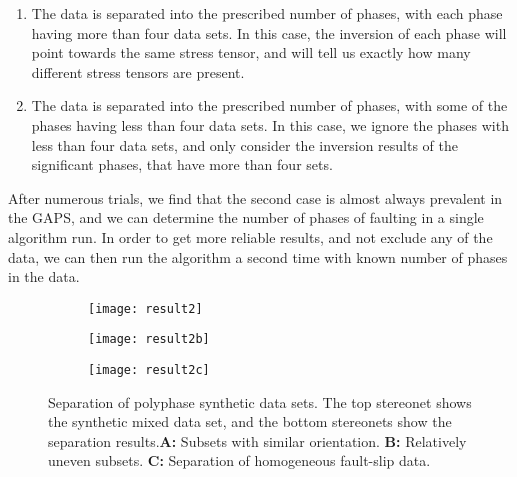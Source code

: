 \renewcommand{\theenumi}{\roman{enumi}}
\begin{enumerate}
    \item The data is separated into the prescribed number of phases, with each phase having more than four data sets. In this case, the inversion of each phase will point towards the same stress tensor, and will tell us exactly how many different stress tensors are present.
    \item The data is separated into the prescribed number of phases, with some of the phases having less than four data sets. In this case, we ignore the phases with less than four data sets, and only consider the inversion results of the significant phases, that have more than four sets.
\end{enumerate}

After numerous trials, we find that the second case is almost always prevalent in the GAPS, and we can determine the number of phases of faulting in a single algorithm run. In order to get more reliable results, and not exclude any of the data, we can then run the algorithm a second time with known number of phases in the data.

\begin{figure}[H]
\begin{subfigure}{\textwidth}
    \centering
    \texttt{[image: result2]}
\end{subfigure}
\end{figure}
\begin{figure}[H]
\ContinuedFloat
\begin{subfigure}{\textwidth}
    \centering
    \texttt{[image: result2b]}
\end{subfigure}
\end{figure}
\begin{figure}[H]
\ContinuedFloat
\begin{subfigure}{\textwidth}
    \centering
    \texttt{[image: result2c]}
\end{subfigure}
\caption{Separation of polyphase synthetic data sets. The top stereonet shows the synthetic mixed data set, and the bottom stereonets show the separation results.\textbf{A:} Subsets with similar orientation. \textbf{B:} Relatively uneven subsets. \textbf{C:} Separation of homogeneous fault-slip data. }
\end{figure}
